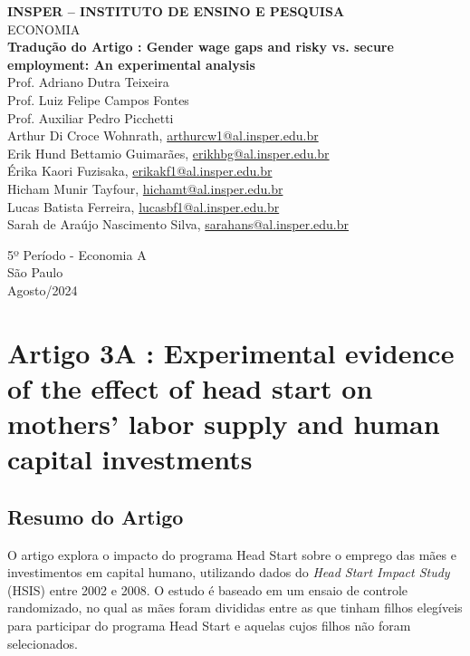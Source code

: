 \documentclass[a4paper,12pt]{article}[abntex2]
\begin{document}
\begin{titlepage}
    \centering
    \vspace*{1cm}
    \Large\textbf{INSPER – INSTITUTO DE ENSINO E PESQUISA}\\
    \Large ECONOMIA\\
    \vspace{1.5cm}
    \Large\textbf{Tradução do Artigo : Gender wage gaps and risky vs. secure employment: An experimental analysis}\\
    \vspace{1.5cm}
    Prof. Adriano Dutra Teixeira\\
    Prof. Luiz Felipe Campos Fontes\\
    Prof. Auxiliar Pedro Picchetti\\
    \vfill
    \normalsize
    Arthur Di Croce Wohnrath, \href{mailto:arthurcw1@al.insper.edu.br}{arthurcw1@al.insper.edu.br}\\
Erik Hund Bettamio Guimarães, \href{mailto:erikhbg@al.insper.edu.br}{erikhbg@al.insper.edu.br}\\
Érika Kaori Fuzisaka, \href{mailto:erikakf1@al.insper.edu.br}{erikakf1@al.insper.edu.br}\\
Hicham Munir Tayfour, \href{mailto:hichamt@al.insper.edu.br}{hichamt@al.insper.edu.br}\\
Lucas Batista Ferreira, \href{mailto:lucasbf1@al.insper.edu.br}{lucasbf1@al.insper.edu.br}\\
Sarah de Araújo Nascimento Silva, \href{mailto:sarahans@al.insper.edu.br}{sarahans@al.insper.edu.br}

    5º Período - Economia A\\
    \vfill
    São Paulo\\
    Agosto/2024
\end{titlepage}

\newpage
\tableofcontents
\thispagestyle{empty} %
\newpage
\setcounter{page}{1} %
\justify
\onehalfspacing

\pagestyle{fancy}
\fancyhf{}
\rhead{\thepage}

\section{\textbf{Artigo 3A : Experimental evidence  of  the  effect  of head start on mothers’ labor supply and human capital investments}}
\subsection{\textbf{Resumo do Artigo}}
O artigo explora o impacto do programa Head Start sobre o emprego das mães e investimentos em capital humano, utilizando dados do \textit{Head Start Impact Study} (HSIS) entre 2002 e 2008. O estudo é baseado em um ensaio de controle randomizado, no qual as mães foram divididas entre as que tinham filhos elegíveis para participar do programa Head Start e aquelas cujos filhos não foram selecionados.
\end{document}
